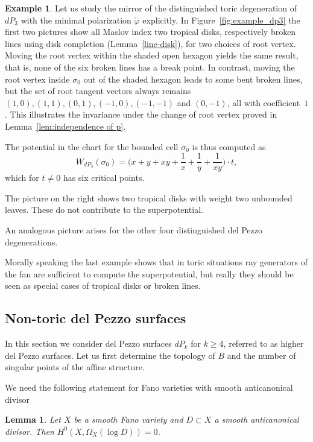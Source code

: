 \documentclass[11pt,letter]{amsart}
\newtheorem{lemma}[theorem]{Lemma}
\theoremstyle{definition}
\newtheorem{example}[theorem]{Example}
\theoremstyle{remark}
\numberwithin{equation}{section}
\numberwithin{figure}{section}
\begin{document}
\begin{example} \label{ex: dP_3}
Let us study the mirror of the distinguished toric degeneration of $dP_3$ with
the minimal polarization $\check\varphi$ explicitly. In
Figure~\ref{fig:example_dp3} the first two pictures show all Maslov index two
tropical disks, respectively broken lines using disk completion
(Lemma~\ref{line-disk}), for two choices of root vertex. Moving the root
vertex within the shaded open hexagon yields the same result, that is, none of
the six broken lines has a break point. In contrast, moving the root vertex
inside $\sigma_0$ out of the shaded hexagon leads to some bent broken lines,
but the set of root tangent vectors always remains $(1,0),(1,1),(0,1),
(-1,0),(-1,-1)$ and $(0,-1)$, all with coefficient~$1$. This illustrates the
invariance under the change of root vertex proved in Lemma~\ref{lem:independence
of p}.

The potential in the chart for the bounded cell $\sigma_0$ is thus computed as
\[
W_{dP_3}(\sigma_0) = \Big(x + y + xy + \frac{1}{x} + \frac{1}{y} +
\frac{1}{xy}\Big) \cdot t,
\]
which for $t\neq 0$ has six critical points.

The picture on the right shows two tropical disks with weight two unbounded
leaves. These do not contribute to the superpotential.

An analogous picture arises for the other four distinguished del
Pezzo degenerations.
\end{example}

Morally speaking the last example shows that in toric situations ray
generators of the fan are sufficient to compute the superpotential,
but really they should be seen as special cases of tropical disks
or broken lines.


\subsection{Non-toric del Pezzo surfaces}
In this section we consider del Pezzo surfaces $dP_k$ for $k\ge
4$, referred to as higher del Pezzo surfaces. Let us first determine
the topology of $B$ and the number of singular points of the
affine structure.

We need the following statement for Fano varieties with smooth anticanonical divisor

\begin{lemma}
\label{Lem: No log holomorphic 1-form}
Let $X$ be a smooth Fano variety and $D\subset X$ a smooth
anticanonical divisor. Then $H^0(X,\Omega_X(\log D))=0$.
\end{lemma}
\end{document}
